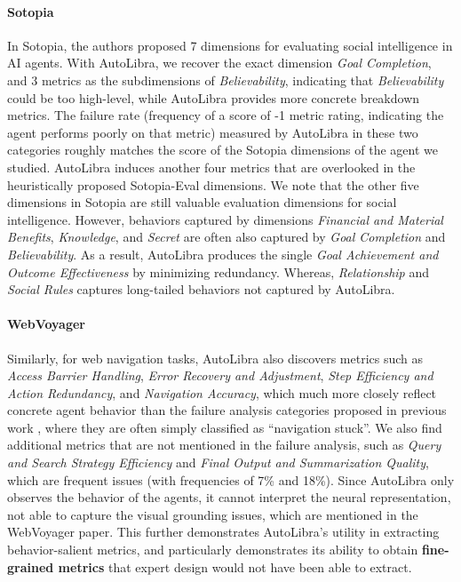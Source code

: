 \paragraph{Sotopia} In Sotopia, the authors \citep{zhousotopia} proposed 7 dimensions for evaluating social intelligence in AI agents.
With AutoLibra, we recover the exact dimension \emph{Goal Completion}, and 3 metrics as the subdimensions of \emph{Believability},
indicating that \textit{Believability} could be too high-level, while AutoLibra provides more concrete breakdown metrics. 
The failure rate (frequency of a score of -1 metric rating, indicating the agent performs poorly on that metric) measured by AutoLibra in these two categories
roughly matches the score of the Sotopia dimensions of the agent we studied.
AutoLibra induces another four metrics that are overlooked in the heuristically proposed Sotopia-Eval dimensions.
We note that the other five dimensions in Sotopia are still valuable evaluation dimensions for social intelligence.
However, behaviors captured by dimensions \emph{Financial and Material Benefits}, \emph{Knowledge}, and \emph{Secret} are often also
captured by \textit{Goal Completion} and \textit{Believability}.
As a result, AutoLibra produces the single \textit{Goal Achievement and Outcome Effectiveness} by minimizing redundancy.
Whereas, \textit{Relationship} and \textit{Social Rules} captures long-tailed behaviors not captured by AutoLibra.



\paragraph{WebVoyager} Similarly, for web navigation tasks, AutoLibra also discovers metrics such as \textit{Access Barrier Handling},
\textit{Error Recovery and Adjustment},
\textit{Step Efficiency and Action Redundancy},
and \textit{Navigation Accuracy},
which much more closely reflect concrete agent behavior than the failure analysis categories proposed in previous work
\citep{he2024webvoyager,zhou2024proposeragentevaluatorpaeautonomousskilldiscovery}, where they are often simply classified as ``navigation stuck''.
We also find additional metrics that are not mentioned in the failure analysis, such as \textit{Query and Search Strategy Efficiency} and
\textit{Final Output and Summarization Quality}, which are frequent issues (with frequencies of 7\% and 18\%).
Since AutoLibra only observes the behavior of the agents, it cannot interpret the neural representation,
not able to capture the visual grounding issues, which are mentioned in the WebVoyager paper.
This further demonstrates AutoLibra's utility in extracting behavior-salient metrics,
and particularly demonstrates its ability to obtain \textbf{fine-grained metrics} that expert design would not have been able to extract. 